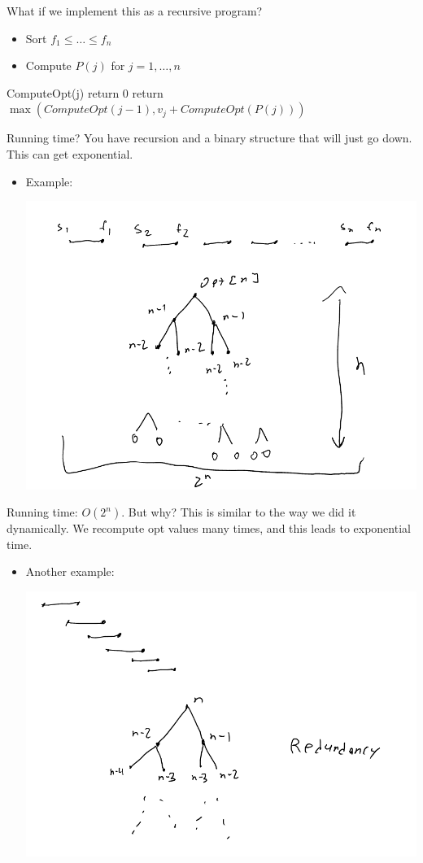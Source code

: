 \documentclass[11pt]{article}
\begin{document}
\begin{enumerate}
What if we implement this as a recursive program?
\begin{itemize}
\item Sort \(f_1 \leq \ldots \leq f_n\)
\item Compute \(P(j)\) for \(j=1,\ldots,n\)
\end{itemize}
\begin{algorithmic}
\State ComputeOpt(j)
    \State return $0$
\Else
    \State return $\max(ComputeOpt(j-1), v_j+ComputeOpt(P(j)))$
\EndIf
\end{algorithmic}
Running time? You have recursion and a binary structure that will just go down. This can get exponential.
\begin{itemize}
\item Example: \begin{center}
\includegraphics[width=.9\linewidth]{./Images/i84.png}
\end{center}
\end{itemize}
Running time: \(O(2^n)\). But why? This is similar to the way we did it dynamically. We recompute opt values many times, and this leads to exponential time.
\begin{itemize}
\item Another example: \begin{center}
\includegraphics[width=.9\linewidth]{./Images/i85.png}

\end{center}
\end{itemize}
\end{enumerate}
\end{document}

